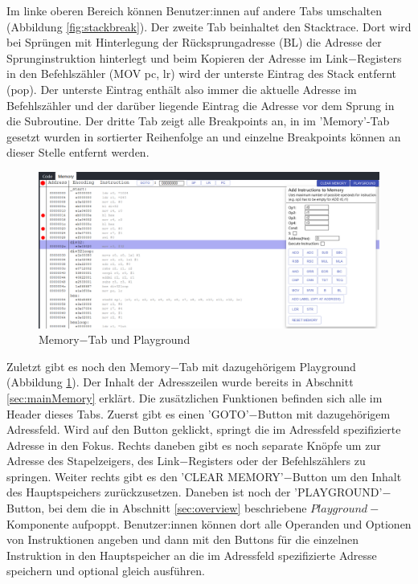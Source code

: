\documentclass[a4paper, 11pt, onecolumn]{article}
\begin{document}
Im linke oberen Bereich können Benutzer:innen auf andere Tabs umschalten (Abbildung \ref{fig:stackbreak}). Der zweite Tab beinhaltet den Stacktrace. Dort wird bei Sprüngen mit Hinterlegung der Rücksprungadresse (BL) die Adresse der Sprunginstruktion hinterlegt und beim Kopieren der Adresse im Link$-$Registers in den Befehlszähler (MOV pc, lr) wird der unterste Eintrag des Stack entfernt (pop). Der unterste Eintrag enthält also immer die aktuelle Adresse im Befehlszähler und der darüber liegende Eintrag die Adresse vor dem Sprung in die Subroutine. Der dritte Tab zeigt alle Breakpoints an, in im 'Memory'-Tab gesetzt wurden in sortierter Reihenfolge an und einzelne Breakpoints können an dieser Stelle entfernt werden.

\begin{figure}[!htb]
\centering
\includegraphics[width=1\textwidth]{data/uimemory}
\caption{Memory$-$Tab und Playground}
\label{fig:uimemory}
\end{figure}

Zuletzt gibt es noch den Memory$-$Tab mit dazugehörigem Playground (Abbildung \ref{fig:uimemory}). Der Inhalt der Adresszeilen wurde bereits in Abschnitt \ref{sec:mainMemory} erklärt. Die zusätzlichen Funktionen befinden sich alle im Header dieses Tabs. Zuerst gibt es einen 'GOTO'$-$Button mit dazugehörigem Adressfeld. Wird auf den Button geklickt, springt die im Adressfeld spezifizierte Adresse in den Fokus. Rechts daneben gibt es noch separate Knöpfe um zur Adresse des Stapelzeigers, des Link$-$Registers oder der Befehlszählers zu springen. Weiter rechts gibt es den 'CLEAR MEMORY'$-$Button um den Inhalt des Hauptspeichers zurückzusetzen. Daneben ist noch der 'PLAYGROUND'$-$Button, bei dem die in Abschnitt \ref{sec:overview} beschriebene $Playground-$Komponente aufpoppt. Benutzer:innen können dort alle Operanden und Optionen von Instruktionen angeben und dann mit den Buttons für die einzelnen Instruktion in den Hauptspeicher an die im Adressfeld spezifizierte Adresse speichern und optional gleich ausführen.
\end{document}
